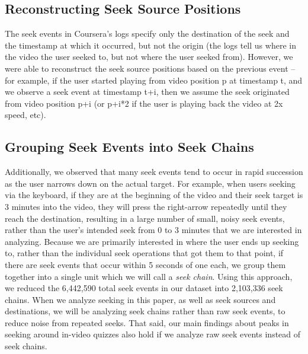 \documentclass{sigchi}
\begin{document}
\subsection{Reconstructing Seek Source Positions}

The seek events in Coursera's logs specify only the destination of the seek and the timestamp at which it occurred, but not the origin (the logs tell us where in the video the user seeked to, but not where the user seeked from). However, we were able to reconstruct the seek source positions based on the previous event -- for example, if the user started playing from video position p at timestamp t, and we observe a seek event at timestamp t+i, then we assume the seek originated from video position p+i (or p+i*2 if the user is playing back the video at 2x speed, etc).

\subsection{Grouping Seek Events into Seek Chains}

Additionally, we observed that many seek events tend to occur in rapid succession as the user narrows down on the actual target. For example, when users seeking via the keyboard, if they are at the beginning of the video and their seek target is 3 minutes into the video, they will press the right-arrow repeatedly until they reach the destination, resulting in a large number of small, noisy seek events, rather than the user's intended seek from 0 to 3 minutes that we are interested in analyzing. Because we are primarily interested in where the user ends up seeking to, rather than the individual seek operations that got them to that point, if there are seek events that occur within 5 seconds of one each, we group them together into a single unit which we will call a \textit{seek chain}. Using this approach, we reduced the 6,442,590 total seek events in our dataset into 2,103,336 seek chains. When we analyze seeking in this paper, as well as seek sources and destinations, we will be analyzing seek chains rather than raw seek events, to reduce noise from repeated seeks. That said, our main findings about peaks in seeking around in-video quizzes also hold if we analyze raw seek events instead of seek chains.

\end{document}
